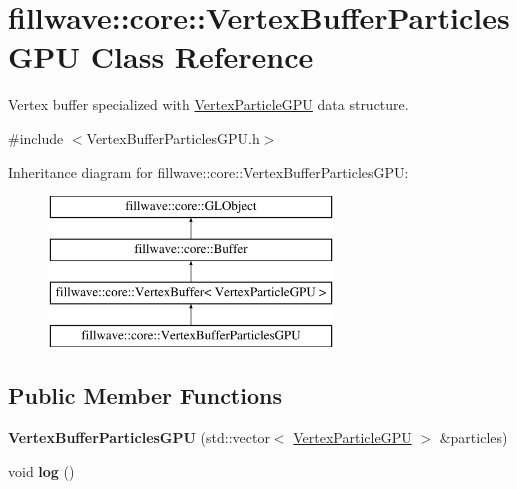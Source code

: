 \hypertarget{classfillwave_1_1core_1_1VertexBufferParticlesGPU}{}\section{fillwave\+:\+:core\+:\+:Vertex\+Buffer\+Particles\+G\+P\+U Class Reference}
\label{classfillwave_1_1core_1_1VertexBufferParticlesGPU}


Vertex buffer specialized with \hyperlink{structfillwave_1_1core_1_1VertexParticleGPU}{Vertex\+Particle\+G\+P\+U} data structure.  




{\ttfamily \#include $<$Vertex\+Buffer\+Particles\+G\+P\+U.\+h$>$}

Inheritance diagram for fillwave\+:\+:core\+:\+:Vertex\+Buffer\+Particles\+G\+P\+U\+:\begin{figure}[H]
\begin{center}
\leavevmode
\includegraphics[height=4.000000cm]{classfillwave_1_1core_1_1VertexBufferParticlesGPU}
\end{center}
\end{figure}
\subsection*{Public Member Functions}
\begin{DoxyCompactItemize}
\item 
\hypertarget{classfillwave_1_1core_1_1VertexBufferParticlesGPU_a2d897d3d0c8ea76190c1d1d42d30ab12}{}{\bfseries Vertex\+Buffer\+Particles\+G\+P\+U} (std\+::vector$<$ \hyperlink{structfillwave_1_1core_1_1VertexParticleGPU}{Vertex\+Particle\+G\+P\+U} $>$ \&particles)\label{classfillwave_1_1core_1_1VertexBufferParticlesGPU_a2d897d3d0c8ea76190c1d1d42d30ab12}

\item 
\hypertarget{classfillwave_1_1core_1_1VertexBufferParticlesGPU_a05a13107bfdbe9e210a8f43741cfb291}{}void {\bfseries log} ()\label{classfillwave_1_1core_1_1VertexBufferParticlesGPU_a05a13107bfdbe9e210a8f43741cfb291}

\end{DoxyCompactItemize}
